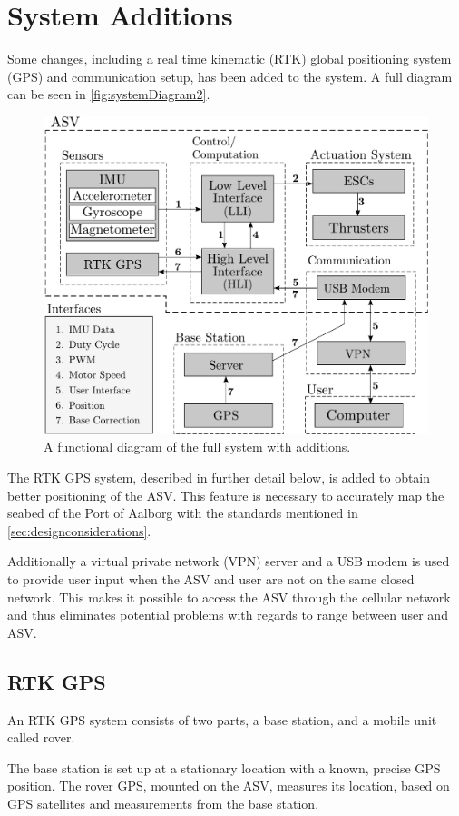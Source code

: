 \section{System Additions}
Some changes, including a real time kinematic (RTK) global positioning system (GPS) and communication setup, has been added to the system. A full diagram can be seen in \autoref{fig:systemDiagram2}.
%
\begin{figure}[H]
  \includegraphics[width=.65\textwidth]{figures/systemDiagram5}
  \caption{A functional diagram of the full system with additions.}
  \label{fig:systemDiagram2}
\end{figure}
%
The RTK GPS system, described in further detail below, is added to obtain better positioning of the ASV. This feature is necessary to accurately map the seabed of the Port of Aalborg with the standards mentioned in \autoref{sec:designconsiderations}.

Additionally a virtual private network (VPN) server and a USB modem is used to provide user input when the ASV and user are not on the same closed network. This makes it possible to access the ASV through the cellular network and thus eliminates potential problems with regards to range between user and ASV.

\subsection{RTK GPS}
An RTK GPS system consists of two parts, a base station, and a  mobile unit called rover.

The base station is set up at a stationary location with a known, precise GPS position. The rover GPS, mounted on the ASV, measures its location, based on GPS satellites and measurements from the base station. \cite{EmlidRTK}

